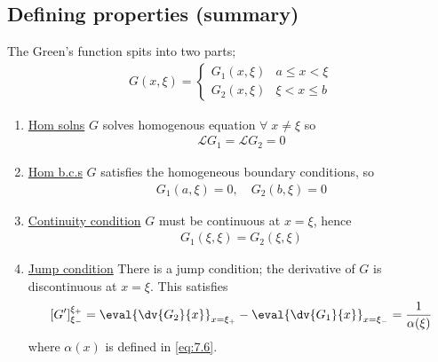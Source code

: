 \subsection{Defining properties (summary)}
The Green's function spits into two parts;
\begin{align} \label{eq:7.9}
	G(x,\xi) = \begin{cases}
		G_1(x,\xi) & a \leq x < \xi \\
		G_2(x,\xi) & \xi < x \leq b
	\end{cases}
\end{align}
\begin{enumerate}
    \item \underline{Hom solns} $G$ solves homogenous equation $\forall \; x \neq \xi$ so 
    \begin{align} \label{eq:7.10}
        \mathcal L G_1 = \mathcal L G_2 = 0
    \end{align} 
    \item \underline{Hom b.c.s} $G$ satisfies the homogeneous boundary conditions, so 
    \begin{align} \label{eq:7.11}
        G_1(a, \xi) = 0,\quad G_2(b, \xi) = 0
    \end{align} 
    \item \underline{Continuity condition} $G$ must be continuous at $x = \xi$, hence
    \begin{align} \label{eq:7.12}
        G_1(\xi, \xi) = G_2(\xi, \xi)
    \end{align} 
    \item \underline{Jump condition} There is a jump condition; the derivative of $G$ is discontinuous at $x = \xi$.
    This satisfies
    \begin{align} \label{eq:7.13}
        [G']_{\xi_-}^{\xi_+} = \eval{\dv{G_2}{x}}_{x = \xi_+} - \eval{\dv{G_1}{x}}_{x = \xi_-} = \frac{1}{\alpha(\xi)}
    \end{align}
    where $\alpha(x)$ is defined in \cref{eq:7.6}.
\end{enumerate} 


